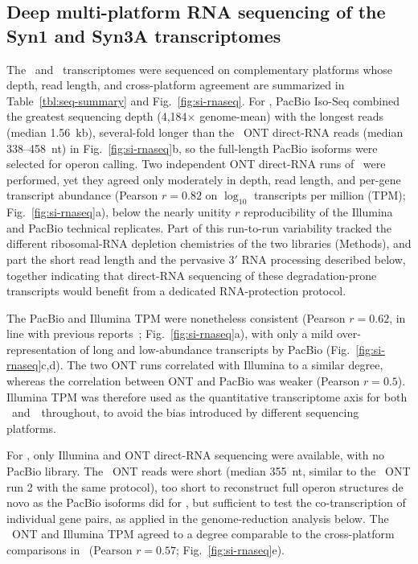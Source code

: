\subsection{Deep multi-platform RNA sequencing of the Syn1 and Syn3A transcriptomes}

The \syn~and \syna~transcriptomes were sequenced on complementary platforms whose depth, read length, and cross-platform agreement are summarized in Table~\ref{tbl:seq-summary} and Fig.~\ref{fig:si-rnaseq}.
For \syn, PacBio Iso-Seq combined the greatest sequencing depth (4{,}184$\times$ genome-mean) with the longest reads (median 1.56~kb), several-fold longer than the \syn~ONT direct-RNA reads (median 338--458~nt) in Fig.~\ref{fig:si-rnaseq}b, so the full-length PacBio isoforms were selected for operon calling.
Two independent ONT direct-RNA runs of \syn~were performed, yet they agreed only moderately in depth, read length, and per-gene transcript abundance (Pearson $r = 0.82$ on $\log_{10}$ transcripts per million (TPM); Fig.~\ref{fig:si-rnaseq}a), below the nearly unitity $r$ reproducibility of the Illumina and PacBio technical replicates.
Part of this run-to-run variability tracked the different ribosomal-RNA depletion chemistries of the two libraries (Methods), and part the short read length and the pervasive 3$'$ RNA processing described below, together indicating that direct-RNA sequencing of these degradation-prone transcripts would benefit from a dedicated RNA-protection protocol.

The PacBio and Illumina TPM were nonetheless consistent (Pearson $r = 0.62$, in line with previous reports~\cite{yan_smrt-cappable-seq_2018}; Fig.~\ref{fig:si-rnaseq}a), with only a mild over-representation of long and low-abundance transcripts by PacBio (Fig.~\ref{fig:si-rnaseq}c,d).
The two ONT runs correlated with Illumina to a similar degree, whereas the correlation between ONT and PacBio was weaker (Pearson $r = 0.5$).
Illumina TPM was therefore used as the quantitative transcriptome axis for both \syn~and~\syna~throughout, to avoid the bias introduced by different sequencing platforms.

For \syna, only Illumina and ONT direct-RNA sequencing were available, with no PacBio library.
The \syna~ONT reads were short (median 355~nt, similar to the \syn~ONT run 2 with the same protocol), too short to reconstruct full operon structures de novo as the PacBio isoforms did for \syn, but sufficient to test the co-transcription of individual gene pairs, as applied in the genome-reduction analysis below.
The \syna~ONT and Illumina TPM agreed to a degree comparable to the cross-platform comparisons in \syn~(Pearson $r = 0.57$; Fig.~\ref{fig:si-rnaseq}e).

